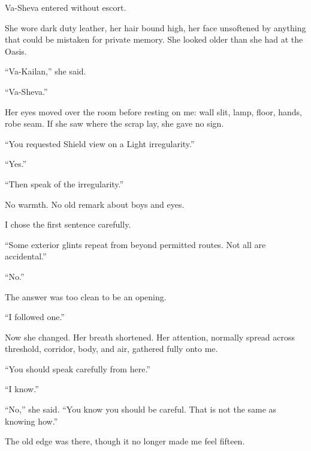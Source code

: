 Va-Sheva entered without escort.\par

She wore dark duty leather, her hair bound high, her face unsoftened by anything that could be mistaken for private memory. She looked older than she had at the Oasis.\par

``Va-Kailan,'' she said.\par

``Va-Sheva.''\par

Her eyes moved over the room before resting on me: wall slit, lamp, floor, hands, robe seam. If she saw where the scrap lay, she gave no sign.\par

``You requested Shield view on a Light irregularity.''\par

``Yes.''\par

``Then speak of the irregularity.''\par

No warmth. No old remark about boys and eyes.\par

I chose the first sentence carefully.\par

``Some exterior glints repeat from beyond permitted routes. Not all are accidental.''\par

``No.''\par

The answer was too clean to be an opening.\par

``I followed one.''\par

Now she changed. Her breath shortened. Her attention, normally spread across threshold, corridor, body, and air, gathered fully onto me.\par

``You should speak carefully from here.''\par

``I know.''\par

``No,'' she said. ``You know you should be careful. That is not the same as knowing how.''\par

The old edge was there, though it no longer made me feel fifteen.\par

